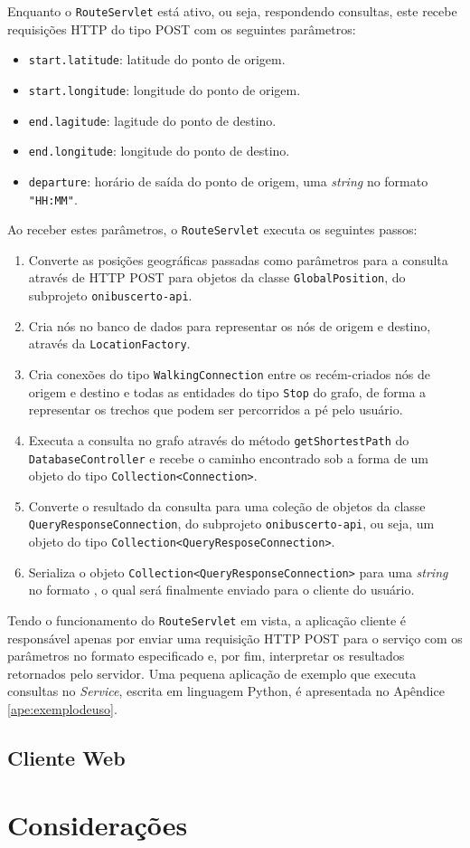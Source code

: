 Enquanto o \texttt{RouteServlet} está ativo, ou seja, respondendo consultas, este recebe requisições HTTP do tipo POST com os seguintes parâmetros:
\begin{itemize}
	\item \texttt{start.latitude}: latitude do ponto de origem.
	\item \texttt{start.longitude}: longitude do ponto de origem.
	\item \texttt{end.lagitude}: lagitude do ponto de destino.
	\item \texttt{end.longitude}: longitude do ponto de destino.
	\item \texttt{departure}: horário de saída do ponto de origem, uma \emph{string} no formato \texttt{"HH:MM"}.
\end{itemize}

Ao receber estes parâmetros, o \texttt{RouteServlet} executa os seguintes passos:
\begin{enumerate}
	\item Converte as posições geográficas passadas como parâmetros para a consulta através de HTTP POST para objetos da classe \texttt{GlobalPosition}, do subprojeto \texttt{onibuscerto-api}.
	\item Cria nós no banco de dados para representar os nós de origem e destino, através da \texttt{LocationFactory}.
	\item Cria conexões do tipo \texttt{WalkingConnection} entre os recém-criados nós de origem e destino e todas as entidades do tipo \texttt{Stop} do grafo, de forma a representar os trechos que podem ser percorridos a pé pelo usuário.
	\item Executa a consulta no grafo através do método \texttt{getShortestPath} do \texttt{DatabaseController} e recebe o caminho encontrado sob a forma de um objeto do tipo \texttt{Collection<Connection>}.
	\item Converte o resultado da consulta para uma coleção de objetos da classe \texttt{QueryResponseConnection}, do subprojeto \texttt{onibuscerto-api}, ou seja, um objeto do tipo \texttt{Collection<QueryResposeConnection>}.
	\item Serializa o objeto \texttt{Collection<QueryResponseConnection>} para uma \emph{string} no formato , o qual será finalmente enviado para o cliente do usuário.
\end{enumerate}

Tendo o funcionamento do \texttt{RouteServlet} em vista, a aplicação cliente é responsável apenas por enviar uma requisição HTTP POST para o serviço com os parâmetros no formato especificado e, por fim, interpretar os resultados retornados pelo servidor.
Uma pequena aplicação de exemplo que executa consultas no \emph{Service}, escrita em linguagem Python, é apresentada no Apêndice \ref{ape:exemplodeuso}.

\subsection{Cliente Web}

\section{Considerações}
